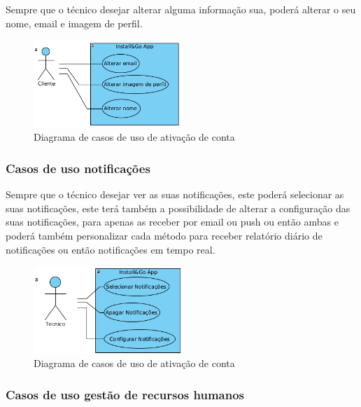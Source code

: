Sempre que o técnico desejar alterar alguma informação sua, poderá alterar o seu nome, email e imagem 
de perfil.

\begin{figure}[htb]
    \centering
    
    \includegraphics[width=0.5\textwidth]{images/diagramas/casos_de_uso/use_case_perfil.png}
    \caption{Diagrama de casos de uso de ativação de conta}
    \label{fig:17}
\end{figure}

\newpage

\subsubsection{Casos de uso notificações}

Sempre que o técnico desejar ver as suas notificações, este poderá selecionar as suas notificações, este
terá também a possibilidade de alterar a configuração das suas notificações, para apenas as receber 
por email ou push ou então ambas e poderá também personalizar cada método para receber
relatório diário de notificações ou então notificações em tempo real.

\begin{figure}[htb]
    \centering
    \includegraphics[width=0.5\textwidth]{images/diagramas/casos_de_uso/use_case_notificacoes.png}
    \caption{Diagrama de casos de uso de ativação de conta}
    \label{fig:18}
\end{figure}

\subsubsection{Casos de uso gestão de recursos humanos}

